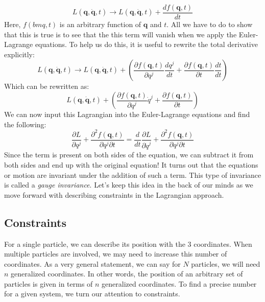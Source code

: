 $$L(\bm{q},\bm{\dot{q}},t)\rightarrow L(\bm{q},\bm{\dot{q}},t)+\frac{d f(\bm{q},t)}{dt}$$
Here, $f(bm{q},t)$ is an arbitrary function of $\bm{q}$ and $t$. All we have to do to show that this is true is to see that the this term will vanish when we apply the Euler-Lagrange equations. To help us do this, it is useful to rewrite the total derivative explicitly:
$$L(\bm{q},\bm{\dot{q}},t)\rightarrow L(\bm{q},\bm{\dot{q}},t)+\left(\frac{\partial f(\bm{q},t)}{\partial q^j}\frac{dq^j}{dt}+\frac{\partial f(\bm{q},t)}{\partial t}\frac{dt}{dt}\right)$$
Which can be rewritten as:
$$L(\bm{q},\bm{\dot{q}},t)+\left(\frac{\partial f(\bm{q},t)}{\partial q^j}\dot{q}^j+\frac{\partial f(\bm{q},t)}{\partial t}\right)$$
We can now input this \gls{Lagrangian} into the Euler-Lagrange equations and find the following:
$$\frac{\partial L}{\partial q^j}+\frac{\partial^2 f(\bm{q},t)}{\partial q^j\partial t}=\frac{d}{dt}\frac{\partial L}{\partial \dot{q}^j}+\frac{\partial^2 f(\bm{q},t)}{\partial q^j\partial t}$$
Since the term is present on both sides of the equation, we can subtract it from both sides and end up with the original equation! It turns out that the equations or motion are invariant under the addition of such a term. This type of invariance is called a \textit{gauge invariance}. Let's keep this idea in the back of our minds as we move forward with describing constraints in the \gls{Lagrangian} approach.

\subsection{Constraints}\label{sec:constaints}
For a single particle, we can describe its position with the 3 coordinates. When multiple particles are involved, we may need to increase this number of coordinates. As a very general statement, we can say for $N$ particles, we will need $n$ generalized coordinates. In other words, the position of an arbitrary set of particles is given in terms of $n$ generalized coordinates. To find a precise number for a given system, we turn our attention to constraints.

